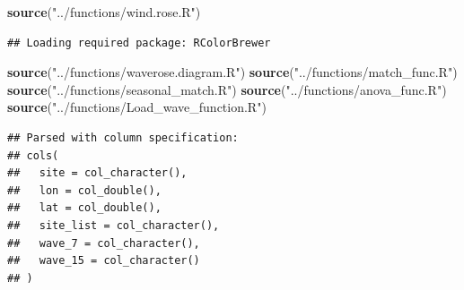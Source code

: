 \documentclass[10pt,A4,]{article}
\newenvironment{Shaded}{\begin{snugshade}}{\end{snugshade}}
\newcommand{\KeywordTok}[1]{\textcolor[rgb]{0.13,0.29,0.53}{\textbf{#1}}}
\newcommand{\StringTok}[1]{\textcolor[rgb]{0.31,0.60,0.02}{#1}}
\newcommand{\NormalTok}[1]{#1}
\begin{document}
\begin{Shaded}
\begin{Highlighting}[]
\KeywordTok{source}\NormalTok{(}\StringTok{"../functions/wind.rose.R"}\NormalTok{)}
\end{Highlighting}
\end{Shaded}

\begin{verbatim}
## Loading required package: RColorBrewer
\end{verbatim}

\begin{Shaded}
\begin{Highlighting}[]
\KeywordTok{source}\NormalTok{(}\StringTok{"../functions/waverose.diagram.R"}\NormalTok{)}
\KeywordTok{source}\NormalTok{(}\StringTok{"../functions/match_func.R"}\NormalTok{)}
\KeywordTok{source}\NormalTok{(}\StringTok{"../functions/seasonal_match.R"}\NormalTok{)}
\KeywordTok{source}\NormalTok{(}\StringTok{"../functions/anova_func.R"}\NormalTok{)}
\KeywordTok{source}\NormalTok{(}\StringTok{"../functions/Load_wave_function.R"}\NormalTok{)}
\end{Highlighting}
\end{Shaded}

\begin{verbatim}
## Parsed with column specification:
## cols(
##   site = col_character(),
##   lon = col_double(),
##   lat = col_double(),
##   site_list = col_character(),
##   wave_7 = col_character(),
##   wave_15 = col_character()
## )
\end{verbatim}
\end{document}
